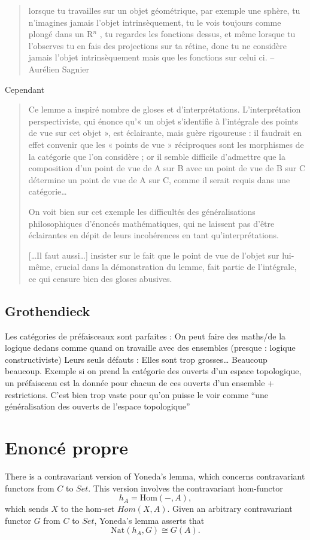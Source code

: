 \documentclass[11pt]{article}
\begin{document}
\begin{quote}
lorsque tu travailles sur un objet géométrique, par exemple une sphère, tu n’imagines jamais l’objet intrinsèquement, tu le vois toujours comme plongé dans un R$^n$ , tu regardes les fonctions dessus, et même lorsque tu l’observes tu en fais des projections sur ta rétine, donc tu ne considère jamais l’objet intrinsèquement mais que les fonctions sur celui ci. -- Aurélien Sagnier
\end{quote}

Cependant
\begin{quote}
Ce lemme a inspiré nombre de gloses et d’interprétations. L’interprétation perspectiviste, qui énonce qu’« un objet s’identifie à l’intégrale des points de vue sur cet objet », est éclairante, mais guère rigoureuse : il faudrait en effet convenir que les « points de vue » réciproques sont les morphismes de la catégorie que l’on considère ; or il semble difficile d’admettre que la composition d’un point de vue de A sur B avec un point de vue de B sur C détermine un point de vue de A sur C, comme il serait requis dans une catégorie\ldots{}

On voit bien sur cet exemple les difficultés des généralisations philosophiques d’énoncés mathématiques, qui ne laissent pas d’être éclairantes en dépit de leurs incohérences en tant qu’interprétations.

[\ldots{}Il faut aussi\ldots{}] insister sur le fait que le point de vue de l’objet sur lui-même, crucial dans la démonstration du lemme, fait partie de l’intégrale, ce qui censure bien des gloses abusives.
\end{quote}
\subsection{Grothendieck}
\label{sec-2-4}

Les catégories de préfaisceaux sont parfaites : On peut faire des maths/de la logique dedans comme quand on travaille avec des ensembles (presque : logique constructiviste)
Leurs seuls défauts : Elles sont trop grosses\ldots{} Beaucoup beaucoup. Exemple si on prend la catégorie des ouverts d'un espace topologique, un préfaisceau est la donnée pour chacun de ces ouverts d'un ensemble + restrictions. C'est bien trop vaste pour qu'on puisse le voir comme ``une généralisation des ouverts de l'espace topologique''
\section{Enoncé propre}
\label{sec-3}

There is a contravariant version of Yoneda's lemma, which concerns contravariant functors from $C$ to $Set$. This version involves the contravariant hom-functor
\[
h_A = \mathrm{Hom}(-, A),
\]
which sends $X$ to the hom-set $Hom(X,A)$. Given an arbitrary contravariant functor $G$ from $C$ to $Set$, Yoneda's lemma asserts that
\[
\mathrm{Nat}(h_A,G) \cong G(A). 
\]
\end{document}
